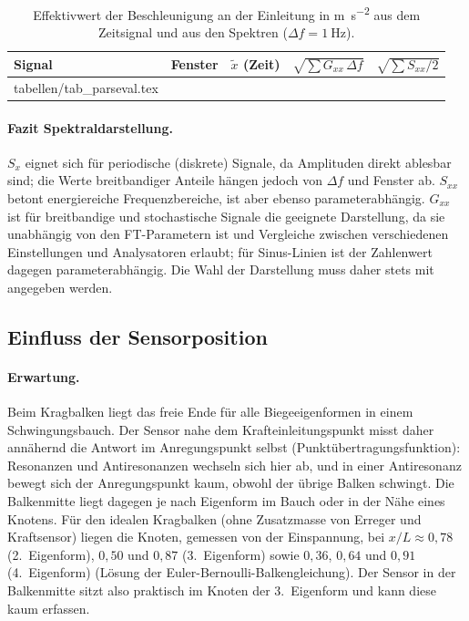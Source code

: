 \documentclass[a4paper,11pt,parskip=half,toc=listof,bibliography=totoc]{scrartcl}
\makeatletter
\newcommand{\Sx}{S_{x}}
\newcommand{\Sxx}{S_{xx}}
\newcommand{\Gxx}{G_{xx}}
\newcommand{\tabinput}[1]{\@@input tabellen/#1.tex }
\makeatother
\begin{document}
\begin{table}[H]
  \centering
  \caption{Effektivwert der Beschleunigung an der Einleitung in
  \si{\metre\per\second\squared} aus dem Zeitsignal und aus den Spektren
  ($\Delta f=\SI{1}{\hertz}$).}
  \label{tab:parseval}
  \begin{tabular}{llrrr}
    \toprule
    Signal & Fenster & $\tilde x$ (Zeit) & $\sqrt{\sum \Gxx\,\Delta f}$ & $\sqrt{\sum \Sxx/2}$ \\
    \midrule
    \tabinput{tab_parseval}
    \bottomrule
  \end{tabular}
\end{table}

\paragraph{Fazit Spektraldarstellung.} $\Sx$ eignet sich für periodische
(diskrete) Signale, da Amplituden direkt ablesbar sind; die Werte
breitbandiger Anteile hängen jedoch von $\Delta f$ und Fenster ab. $\Sxx$
betont energiereiche Frequenzbereiche, ist aber ebenso parameterabhängig.
$\Gxx$ ist für breitbandige und stochastische Signale die geeignete
Darstellung, da sie unabhängig von den FT-Parametern ist und Vergleiche
zwischen verschiedenen Einstellungen und Analysatoren erlaubt; für Sinus-Linien
ist der Zahlenwert dagegen parameterabhängig. Die Wahl der Darstellung muss
daher stets mit angegeben werden.

\subsection{Einfluss der Sensorposition}\label{sec:position}

\paragraph{Erwartung.} Beim Kragbalken liegt das freie Ende für alle
Biegeeigenformen in einem Schwingungsbauch. Der Sensor nahe dem
Krafteinleitungspunkt misst daher annähernd die Antwort im Anregungspunkt
selbst (Punktübertragungsfunktion): Resonanzen und Antiresonanzen wechseln
sich hier ab, und in einer Antiresonanz bewegt sich der Anregungspunkt kaum,
obwohl der übrige Balken schwingt. Die Balkenmitte liegt dagegen je nach
Eigenform im Bauch oder in der Nähe eines Knotens. Für den idealen Kragbalken
(ohne Zusatzmasse von Erreger und Kraftsensor) liegen die Knoten, gemessen von
der Einspannung, bei $x/L \approx 0{,}78$ (2.~Eigenform), $0{,}50$ und $0{,}87$
(3.~Eigenform) sowie $0{,}36$, $0{,}64$ und $0{,}91$ (4.~Eigenform)
(Lösung der Euler-Bernoulli-Balkengleichung). Der Sensor in der Balkenmitte sitzt also praktisch im Knoten
der 3.~Eigenform und kann diese kaum erfassen.
\end{document}
